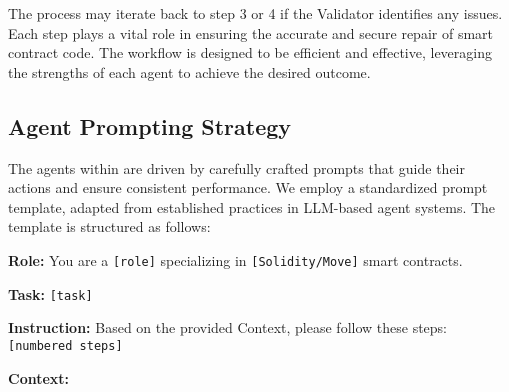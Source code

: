 
    
    

The process may iterate back to step 3 or 4 if the Validator identifies any issues. Each step plays a vital role in ensuring the accurate and secure repair of smart contract code. The workflow is designed to be efficient and effective, leveraging the strengths of each agent to achieve the desired outcome.

\subsection{Agent Prompting Strategy}

The agents within \sln{} are driven by carefully crafted prompts that guide their actions and ensure consistent performance. We employ a standardized prompt template, adapted from established practices in LLM-based agent systems. The template is structured as follows:

\begin{tcolorbox}[
  colback=gray!10, %
  colframe=gray!50, %
  title=Prompt Template,
  fonttitle=\bfseries,
  boxrule=0.75mm, %
  rounded corners, %
  left=1mm, %
  right=1mm, %
  top=1mm, %
  bottom=1mm, %
  label=box:prompttemplate
]
\textbf{Role:} You are a \texttt{[role]} specializing in \texttt{[Solidity/Move]} smart contracts.

\textbf{Task:} \texttt{[task]}

\textbf{Instruction:} Based on the provided Context, please follow these steps: \texttt{[numbered steps]}

\textbf{Context:} 
\end{tcolorbox}

